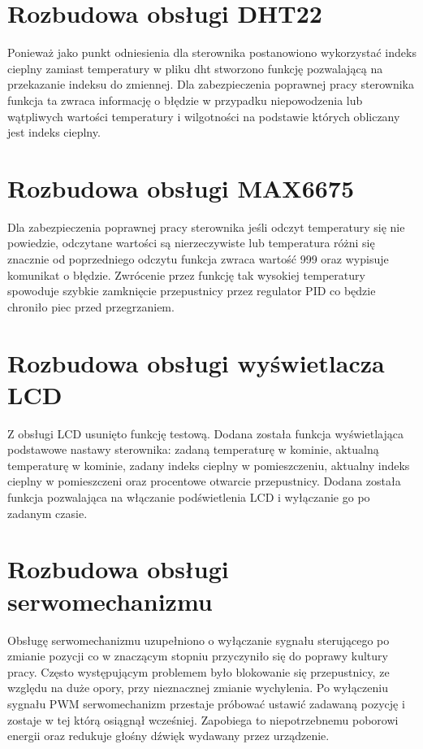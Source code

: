 \documentclass[11pt]{report}
\begin{document}
 \section{Rozbudowa obsługi DHT22}
 Ponieważ jako punkt odniesienia dla sterownika postanowiono wykorzystać indeks cieplny zamiast temperatury w pliku dht stworzono funkcję pozwalającą na przekazanie indeksu do zmiennej. Dla zabezpieczenia poprawnej pracy sterownika funkcja ta zwraca informację o błędzie w przypadku niepowodzenia lub wątpliwych wartości temperatury i wilgotności na podstawie których obliczany jest indeks cieplny. 

 \section{Rozbudowa obsługi MAX6675}
 Dla zabezpieczenia poprawnej pracy sterownika jeśli odczyt temperatury się nie powiedzie, odczytane wartości są nierzeczywiste lub temperatura różni się znacznie od poprzedniego odczytu funkcja zwraca wartość 999 oraz wypisuje komunikat o błędzie. Zwrócenie przez funkcję tak wysokiej temperatury spowoduje szybkie zamknięcie przepustnicy przez regulator PID co będzie chroniło piec przed przegrzaniem.
 
 \section{Rozbudowa obsługi wyświetlacza LCD}
 Z obsługi LCD usunięto funkcję testową. Dodana została funkcja wyświetlająca podstawowe nastawy sterownika: zadaną temperaturę w kominie, aktualną temperaturę w kominie, zadany indeks cieplny w pomieszczeniu, aktualny indeks cieplny w pomieszczeni oraz procentowe otwarcie przepustnicy. Dodana została funkcja pozwalająca na włączanie podświetlenia LCD i wyłączanie go po zadanym czasie.

 \section{Rozbudowa obsługi serwomechanizmu}
 Obsługę serwomechanizmu uzupełniono o wyłączanie sygnału sterującego po zmianie pozycji co w znaczącym stopniu przyczyniło się do poprawy kultury pracy. Często występującym problemem było blokowanie się przepustnicy, ze względu na duże opory, przy nieznacznej zmianie wychylenia. Po wyłączeniu sygnału PWM serwomechanizm przestaje próbować ustawić zadawaną pozycję i zostaje w tej którą osiągnął wcześniej. Zapobiega to niepotrzebnemu poborowi energii oraz redukuje głośny dźwięk wydawany przez urządzenie.
\end{document}
